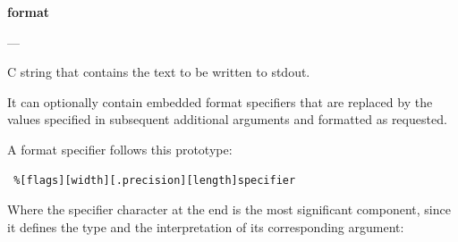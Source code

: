 \documentclass[10pt]{article}
\begin{document}
\textbf{format}

---

C string that contains the text to be written to stdout.

It can optionally contain embedded format specifiers that are replaced by the
values specified in subsequent additional arguments and formatted as requested.

A format specifier follows this prototype:

\begin{lstlisting}
 %[flags][width][.precision][length]specifier
\end{lstlisting}

Where the specifier character at the end is the most significant component,
since it defines the type and the interpretation of its corresponding argument:
\end{document}
